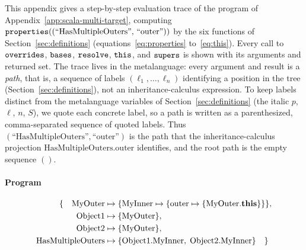 This appendix gives a step-by-step evaluation trace of the program of
Appendix~\ref{app:scala-multi-target}, computing
$\mathtt{properties}((\text{``HasMultipleOuters''},\, \text{``outer''}))$ by the six
functions of Section~\ref{sec:definitions}
(equations~\ref{eq:properties} to~\ref{eq:this}).
Every call to $\mathtt{overrides}$, $\mathtt{bases}$, $\mathtt{resolve}$, $\mathtt{this}$, and $\mathtt{supers}$
is shown with its arguments and returned set.
The trace lives in the metalanguage: every argument and result is a
\emph{path}, that is, a sequence of labels
$(\ell_1, \ldots, \ell_n)$ identifying a position in the tree
(Section~\ref{sec:definitions}), not an inheritance-calculus expression.
To keep labels distinct from the metalanguage variables of
Section~\ref{sec:definitions} (the italic $p$, $\ell$, $n$, $S$), we
quote each concrete label, so a path is written as a parenthesized,
comma-separated sequence of quoted labels.
Thus $(\text{``HasMultipleOuters''}, \text{``outer''})$ is the path that
the inheritance-calculus projection
$\mathrm{HasMultipleOuters}.\mathrm{outer}$ identifies, and the root path
is the empty sequence $()$.

\paragraph{Program}
\begin{align*}
  \{ \quad \mathrm{MyOuter} &\mapsto \{
      \mathrm{MyInner} \mapsto \{
    \mathrm{outer} \mapsto \{\mathrm{MyOuter}.\mathbf{this}\}\}\}, \\
    \mathrm{Object1} &\mapsto \{\mathrm{MyOuter}\}, \\
    \mathrm{Object2} &\mapsto \{\mathrm{MyOuter}\}, \\
    \mathrm{HasMultipleOuters} &\mapsto \{
      \mathrm{Object1}.\mathrm{MyInner},\;
    \mathrm{Object2}.\mathrm{MyInner}\}
  \quad \}
\end{align*}

